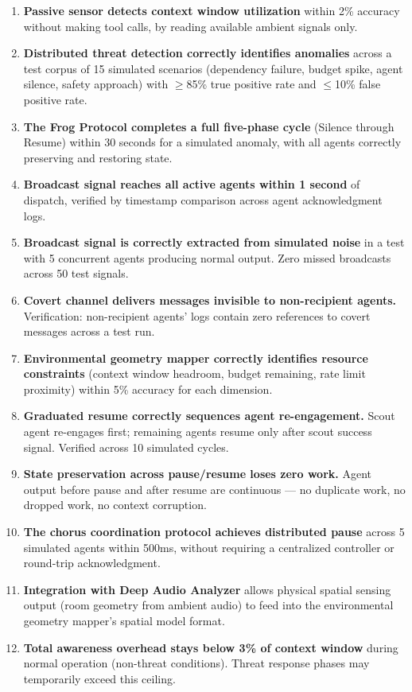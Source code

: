 \documentclass[11pt,letterpaper]{article}
\begin{document}
\begin{enumerate}[leftmargin=2em]
\item \textbf{Passive sensor detects context window utilization} within 2\% accuracy without making tool calls, by reading available ambient signals only.

\item \textbf{Distributed threat detection correctly identifies anomalies} across a test corpus of 15 simulated scenarios (dependency failure, budget spike, agent silence, safety approach) with $\geq$85\% true positive rate and $\leq$10\% false positive rate.

\item \textbf{The Frog Protocol completes a full five-phase cycle} (Silence through Resume) within 30 seconds for a simulated anomaly, with all agents correctly preserving and restoring state.

\item \textbf{Broadcast signal reaches all active agents within 1 second} of dispatch, verified by timestamp comparison across agent acknowledgment logs.

\item \textbf{Broadcast signal is correctly extracted from simulated noise} in a test with 5 concurrent agents producing normal output. Zero missed broadcasts across 50 test signals.

\item \textbf{Covert channel delivers messages invisible to non-recipient agents.} Verification: non-recipient agents' logs contain zero references to covert messages across a test run.

\item \textbf{Environmental geometry mapper correctly identifies resource constraints} (context window headroom, budget remaining, rate limit proximity) within 5\% accuracy for each dimension.

\item \textbf{Graduated resume correctly sequences agent re-engagement.} Scout agent re-engages first; remaining agents resume only after scout success signal. Verified across 10 simulated cycles.

\item \textbf{State preservation across pause/resume loses zero work.} Agent output before pause and after resume are continuous --- no duplicate work, no dropped work, no context corruption.

\item \textbf{The chorus coordination protocol achieves distributed pause} across 5 simulated agents within 500ms, without requiring a centralized controller or round-trip acknowledgment.

\item \textbf{Integration with Deep Audio Analyzer} allows physical spatial sensing output (room geometry from ambient audio) to feed into the environmental geometry mapper's spatial model format.

\item \textbf{Total awareness overhead stays below 3\% of context window} during normal operation (non-threat conditions). Threat response phases may temporarily exceed this ceiling.
\end{enumerate}
\end{document}
